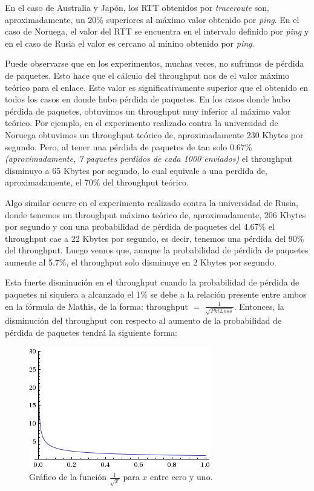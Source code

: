 En el caso de Australia y Japón, los RTT obtenidos por \textit{traceroute} son, aproximadamente, un 20\% superiores al máximo valor obtenido por \textit{ping}.
En el caso de Noruega, el valor del RTT se encuentra en el intervalo definido por \textit{ping} y en el caso de Rusia el valor es cercano al mínino obtenido por \textit{ping}.


Puede observarse que en los experimentos, muchas veces, no sufrimos de pérdida de paquetes. Esto hace que el cálculo del throughput nos de el valor máximo teórico para el enlace. Este valor es significativamente superior que el obtenido en todos los casos en donde hubo pérdida de paquetes. En los casos donde hubo pérdida de paquetes, obtuvimos un throughput muy inferior al máximo valor teórico. Por ejemplo, en el experimento realizado contra la universidad de Noruega obtuvimos un throughput teórico de, aproximadamente 230 Kbytes por segundo. Pero, al tener una pérdida de paquetes de tan solo 0.67\% \textit{(aproximadamente, 7 paquetes perdidos de cada 1000 enviados)} el throughput disminuyo a 65 Kbytes por segundo, lo cual equivale a una perdida de, aproximadamente, el 70\% del throughput teórico.

Algo similar ocurre en el experimento realizado contra la universidad de Rusia, donde tenemos un throughput máximo teórico de, aproximadamente, 206 Kbytes por segundo y con una probabilidad de pérdida de paquetes del 4.67\% el throughput cae a 22 Kbytes por segundo, es decir, tenemos una pérdida del 90\% del throughput. Luego vemos que, aunque la probabilidad de pérdida de paquetes aumente al 5.7\%, el throughput solo disminuye en 2 Kbytes por segundo.

Esta fuerte disminución en el throughput cuando la probabilidad de pérdida de paquetes ni siquiera a alcanzado el 1\% se debe a la relación presente entre ambos en la fórmula de Mathis, de la forma: throughput $=$ $\frac{1}{\sqrt{PktLoss}}$. Entonces, la disminución del throughput con respecto al aumento de la probabilidad de pérdida de paquetes tendrá la siguiente forma:


\begin{figure}[H]
  \centering
    \includegraphics[scale=1]{../Experimentacion/unoraizx.png}
    \caption{Gráfico de la función $\frac{1}{\sqrt{x}}$ para $x$ entre cero y uno.}
  \label{unaraizx}
\end{figure}


